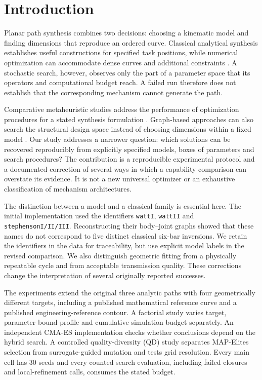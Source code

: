 \documentclass[applsci,article,submit,pdftex,moreauthors]{Definitions/mdpi}
\begin{document}
\section{Introduction}
Planar path synthesis combines two decisions: choosing a kinematic model and finding dimensions that reproduce an ordered curve. Classical analytical synthesis establishes useful constructions for specified task positions, while numerical optimization can accommodate dense curves and additional constraints \cite{Freudenstein1954,McCarthy2010,Soh2008,Plecnik2016a}. A stochastic search, however, observes only the part of a parameter space that its operators and computational budget reach. A failed run therefore does not establish that the corresponding mechanism cannot generate the path.

Comparative metaheuristic studies address the performance of optimization procedures for a stated synthesis formulation \cite{Kang2022,Winyangkul2026}. Graph-based approaches can also search the structural design space instead of choosing dimensions within a fixed model \cite{Fogelson2023}. Our study addresses a narrower question: which solutions can be recovered reproducibly from explicitly specified models, boxes of parameters and search procedures? The contribution is a reproducible experimental protocol and a documented correction of several ways in which a capability comparison can overstate its evidence. It is not a new universal optimizer or an exhaustive classification of mechanism architectures.

The distinction between a model and a classical family is essential here. The initial implementation used the identifiers \texttt{wattI}, \texttt{wattII} and \texttt{stephensonI/II/III}. Reconstructing their body--joint graphs showed that these names do not correspond to five distinct classical six-bar inversions. We retain the identifiers in the data for traceability, but use explicit model labels in the revised comparison. We also distinguish geometric fitting from a physically repeatable cycle and from acceptable transmission quality. These corrections change the interpretation of several originally reported successes.

The experiments extend the original three analytic paths with four geometrically different targets, including a published mathematical reference curve and a published engineering-reference contour. A factorial study varies target, parameter-bound profile and cumulative simulation budget separately. An independent CMA-ES implementation checks whether conclusions depend on the hybrid search. A controlled quality-diversity (QD) study separates MAP-Elites selection from surrogate-guided mutation and tests grid resolution. Every main cell has 30 seeds and every counted search evaluation, including failed closures and local-refinement calls, consumes the stated budget.
\end{document}
